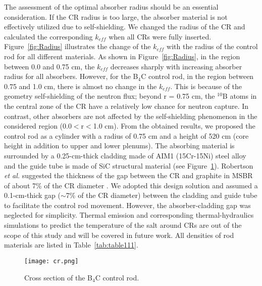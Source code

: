 The assessment of the optimal absorber radius should be an essential consideration. If the CR radius is too large, the absorber material is not effectively utilized due to self-shielding. We changed the radius of the CR and calculated the corresponding $k_{eff}$ when all CRs were fully inserted. Figure~\ref{fig:Radius} illustrates the change of the $k_{eff}$ with the radius of the control rod for all different materials. As shown in Figure~\ref{fig:Radius}, in the region between 0.0 and 0.75 cm, the $k_{eff}$ decreases sharply with increasing absorber radius for all absorbers. However, for the B$_4$C control rod, in the region between 0.75 and 1.0 cm, there is almost no change in the $k_{eff}$. This is because of the geometry self-shielding of the neutron flux; beyond r = 0.75 cm, the $^{10}$B atoms in the central zone of the CR have a relatively low chance for neutron capture. In contrast, other absorbers are not affected by the self-shielding phenomenon in the considered region (0.0$<$r$<$1.0 cm). From the obtained results, we proposed the control rod as a cylinder with a radius of 0.75 cm and a height of 520 cm (core height in addition to upper and lower plenums).
The absorbing material is surrounded by a 0.25-cm-thick cladding made of AIM1 
(15Cr-15Ni) steel alloy \cite{SERAN2017285} and the guide tube is made of 
SiC structural material (see Figure~\ref{fig:cr}). Robertson \emph{et al.} suggested the thickness of the gap between the CR and graphite in MSBR of about 7\% of the CR diameter \cite{robertson_conceptual_1971}. We adopted this design solution and assumed a 0.1-cm-thick gap ($\sim$7\% of the CR diameter) between the cladding and guide tube to facilitate the control rod movement. However, the absorber-cladding gap was neglected for simplicity. Thermal emission and corresponding thermal-hydraulics simulations to predict the temperature of the salt around CRs are out of the scope of this study and will be covered in future work. All densities of rod materials are listed in
Table~\ref{tab:table111}.

\begin{figure}[t!]  %
	\centering
	\hspace{+0.65in} 
	\texttt{[image: cr.png]}
	\caption{Cross section of the B$_4$C control rod.}
	\label{fig:cr}
\end{figure}

